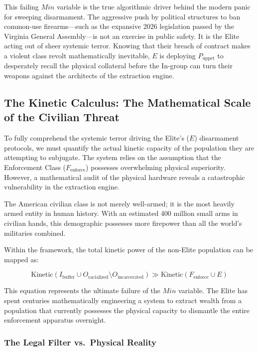 \documentclass[12pt,openany]{book}
\begin{document}
This failing $Min$ variable is the true algorithmic driver behind the modern panic for sweeping disarmament. The aggressive push by political structures to ban common-use firearms---such as the expansive 2026 legislation passed by the Virginia General Assembly---is not an exercise in public safety. It is the Elite acting out of sheer systemic terror. Knowing that their breach of contract makes a violent class revolt mathematically inevitable, $E$ is deploying $P_{\text{uppet}}$ to desperately recall the physical collateral before the In-group can turn their weapons against the architects of the extraction engine.

\subsection{The Kinetic Calculus: The Mathematical Scale of the Civilian Threat}

To fully comprehend the systemic terror driving the Elite's ($E$) disarmament protocols, we must quantify the actual kinetic capacity of the population they are attempting to subjugate. The system relies on the assumption that the Enforcement Class ($F_{\text{enforce}}$) possesses overwhelming physical superiority. However, a mathematical audit of the physical hardware reveals a catastrophic vulnerability in the extraction engine.

The American civilian class is not merely well-armed; it is the most heavily armed entity in human history. With an estimated 400 million small arms in civilian hands, this demographic possesses more firepower than all the world's militaries combined.

Within the framework, the total kinetic power of the non-Elite population can be mapped as:

\[
\text{Kinetic}(I_{\text{buffer}} \cup O_{\text{racialized}} \setminus O_{\text{incarcerated}}) \gg \text{Kinetic}(F_{\text{enforce}} \cup E)
\]

This equation represents the ultimate failure of the $Min$ variable. The Elite has spent centuries mathematically engineering a system to extract wealth from a population that currently possesses the physical capacity to dismantle the entire enforcement apparatus overnight.

\subsubsection*{The Legal Filter vs.\ Physical Reality}
\end{document}
